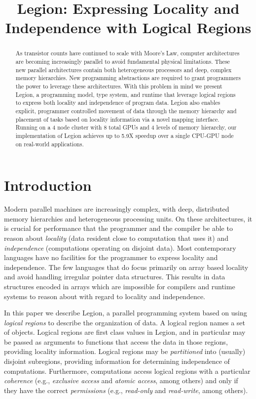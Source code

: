 \documentclass[9pt,nocopyrightspace]{sigplanconf}
\begin{document}
\title{Legion: Expressing Locality and Independence with Logical Regions}
\authorinfo{}{}{}
\maketitle

\begin{abstract}
As transistor counts have continued to scale with Moore's Law, computer
architectures are becoming increasingly parallel to avoid fundamental
physical limitations.  These new parallel architectures contain both
heterogeneous processors and deep, complex memory hierarchies.  New
programming abstractions are required to grant programmers the power
to leverage these architectures.  With this problem in mind we present Legion, 
a programming model, type system, and runtime that leverage 
logical regions to express both locality and independence of program data.  
Legion also enables explicit, programmer controlled movement of data through
the memory hierarchy and placement of tasks based on locality information
via a novel mapping interface.  Running on a 4 node cluster with 8 total GPUs 
and 4 levels of memory hierarchy, our implementation of Legion 
achieves up to 5.9X speedup over a single CPU-GPU node on real-world applications.
\end{abstract}

\section{Introduction}
\label{sect:intro}
Modern parallel machines are increasingly complex, with deep,
distributed memory hierarchies and heterogeneous processing units.  On
these architectures, it is crucial for performance that the programmer
and the compiler be able to reason about {\em locality} (data resident
close to computation that uses it) and {\em independence} (computations
operating on disjoint data).  Most contemporary
languages have no facilities for the programmer to express locality
and independence.  The few languages that do focus primarily on
array based locality \cite{Fatahalian06,CHAPEL04,UPC99} and 
avoid handling irregular pointer data structures.  This results in
data structures encoded in arrays which are impossible for compilers
and runtime systems to reason about with regard to locality and independence.

In this paper we describe Legion, a parallel programming system based
on using {\em logical regions} to describe the organization of data.
A logical region names a set of objects.  Logical regions are first
class values in Legion, and in particular may be passed as arguments
to functions that access the data in those regions, providing locality
information.  Logical regions may be {\em partitioned} into (usually)
disjoint subregions, providing information for determining independence of computations.  Furthermore,
computations access logical regions with a particular {\em coherence}
(e.g., {\em exclusive access} and {\em atomic access}, among others)
and only if they have the correct {\em permissions} (e.g., {\em
  read-only} and {\em read-write}, among others).
\end{document}
